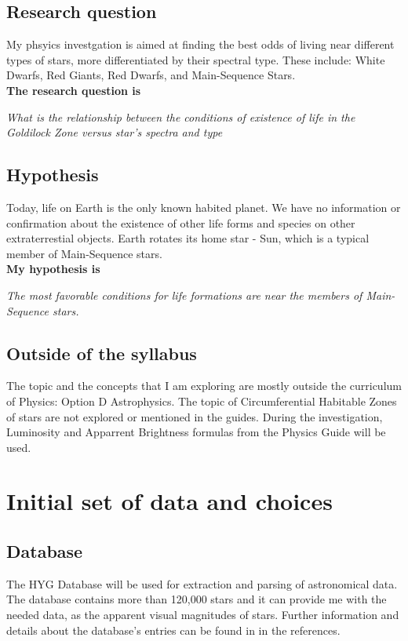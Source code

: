 \documentclass{article}
\begin{document}
\subsection{Research question}

My phsyics investgation is aimed at finding the best odds of living near different types of stars, more differentiated by their spectral type. These include: White Dwarfs, Red Giants, Red Dwarfs, and Main-Sequence Stars.\\

\textbf{The research question is}

\textit{What is the relationship between the conditions of existence of life in the Goldilock Zone versus star's spectra and type }

\subsection{Hypothesis}

Today, life on Earth is the only known habited planet. We have no information or confirmation about the existence of other life forms and species on other extraterrestial objects. Earth rotates its home star - Sun, which is a typical member of Main-Sequence stars.\\

\textbf{My hypothesis is}

  \textit{The most favorable conditions for life formations are near the members of Main-Sequence stars.}

  \subsection{Outside of the syllabus}

  The topic and the concepts that I am exploring are mostly outside the curriculum of Physics: Option D Astrophysics. The topic of Circumferential Habitable Zones of stars are not explored or mentioned in the guides. During the investigation, Luminosity and Apparrent Brightness formulas from the Physics Guide will be used. 

  
\section{Initial set of data and choices}

  \subsection{Database}
  \label{database}
  The HYG Database \cite{hyg} will be used for extraction and parsing of astronomical data. The database contains more than 120,000 stars and it can provide me with the needed data, as the apparent visual magnitudes of stars. Further information and details about the database's entries can be found in in the references.\\  
  
\end{document}
